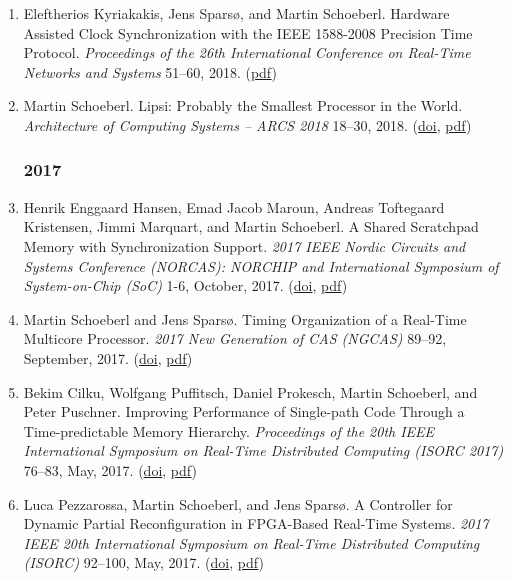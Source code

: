 \begin{enumerate}
\item Eleftherios Kyriakakis, Jens Spars{\o}, and Martin Schoeberl.
 Hardware Assisted Clock Synchronization with the IEEE 1588-2008 Precision Time Protocol.
 \emph{Proceedings of the 26th International Conference on Real-Time Networks and Systems} 51--60, 2018.
(\href{http://www.jopdesign.com/doc/ptpassist.pdf}{pdf})

\item Martin Schoeberl.
 Lipsi: Probably the Smallest Processor in the World.
 \emph{Architecture of Computing Systems -- ARCS 2018} 18--30, 2018.
(\href{http://dx.doi.org/10.1007/978-3-319-77610-1_2}{doi}, \href{https://www.jopdesign.com/doc/lipsi.pdf}{pdf})


\subsubsection*{2017}

\item Henrik Enggaard Hansen, Emad Jacob Maroun, Andreas Toftegaard Kristensen, Jimmi Marquart, and Martin Schoeberl.
 A Shared Scratchpad Memory with Synchronization Support.
 \emph{2017 IEEE Nordic Circuits and Systems Conference (NORCAS): NORCHIP and International Symposium of System-on-Chip (SoC)} 1-6, October, 2017.
(\href{http://dx.doi.org/10.1109/NORCHIP.2017.8124992}{doi}, \href{http://www.jopdesign.com/doc/spmsync.pdf}{pdf})

\item Martin Schoeberl and Jens Spars{\o}.
 Timing Organization of a Real-Time Multicore Processor.
 \emph{2017 New Generation of CAS (NGCAS)} 89--92, September, 2017.
(\href{http://dx.doi.org/10.1109/NGCAS.2017.73}{doi}, \href{http://www.jopdesign.com/doc/timeorg.pdf}{pdf})

\item Bekim Cilku, Wolfgang Puffitsch, Daniel Prokesch, Martin Schoeberl, and Peter Puschner.
 Improving Performance of Single-path Code Through a Time-predictable Memory Hierarchy.
 \emph{Proceedings of the 20th IEEE International Symposium on Real-Time Distributed Computing (ISORC 2017)} 76--83, May, 2017.
(\href{http://dx.doi.org/10.1109/ISORC.2017.17}{doi}, \href{http://www.jopdesign.com/doc/patpref.pdf}{pdf})

\item Luca Pezzarossa, Martin Schoeberl, and Jens Spars{\o}.
 A Controller for Dynamic Partial Reconfiguration in FPGA-Based Real-Time Systems.
 \emph{2017 IEEE 20th International Symposium on Real-Time Distributed Computing (ISORC)} 92--100, May, 2017.
(\href{http://dx.doi.org/10.1109/ISORC.2017.3}{doi}, \href{http://www.jopdesign.com/doc/icap-ctrl.pdf}{pdf})


\end{enumerate}
